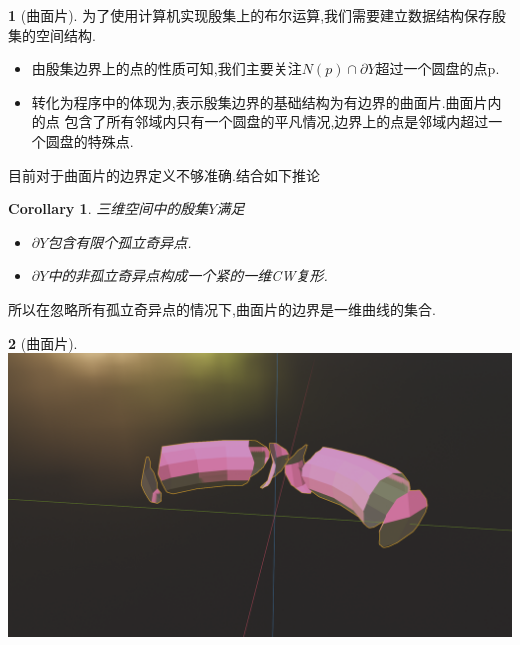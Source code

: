 \documentclass[UTF8]{ctexbeamer}	%
\theoremstyle{plain}
\newtheorem{cor}{Corollary}[section]
\theoremstyle{definition}
\newtheorem{emt}{}[section]
\theoremstyle{remark}
\numberwithin{equation}{section}
\begin{document}
\begin{frame}
    \begin{emt}[曲面片]
        为了使用计算机实现殷集上的布尔运算,我们需要建立数据结构保存殷集的空间结构.
        \begin{itemize}
            \item 由殷集边界上的点的性质可知,我们主要关注$N(p) \cap \partial Y$超过一个圆盘的点p.
            \item 转化为程序中的体现为,表示殷集边界的基础结构为有边界的曲面片.曲面片内的点
            包含了所有邻域内只有一个圆盘的平凡情况,边界上的点是邻域内超过一个圆盘的特殊点.
        \end{itemize}
        目前对于曲面片的边界定义不够准确.结合如下推论
        \begin{cor}
三维空间中的殷集$Y$满足
\begin{itemize}
    \item $\partial Y$包含有限个孤立奇异点.
    \item $\partial Y$中的非孤立奇异点构成一个紧的一维CW复形.
\end{itemize}
            \end{cor}
            所以在忽略所有孤立奇异点的情况下,曲面片的边界是一维曲线的集合.
    \end{emt}
\end{frame}

\begin{frame}
    \begin{emt}[曲面片]
        \includegraphics[width = \textwidth]{fig/s3p1.png}
    \end{emt}
\end{frame}
\end{document}
